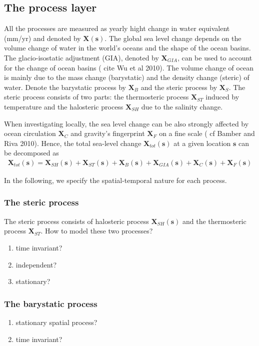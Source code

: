 \documentclass[cmbright,fleqn,referee]{envauth}
\newcommand{\bX}{\bm{X}}
\newcommand{\bs}{\bm{s}}
\begin{document}
\subsection{The process layer}
\label{ss:process}
All the processes are measured as yearly hight change in water equivalent (mm/yr) and denoted by $\bX(\bs)$. The global sea level change depends on the volume change of water in the world's oceans and the shape of the ocean basins. The glacio-isostatic adjustment (GIA), denoted by $\bX_{GIA}$, can be used to account for the change of ocean basins ({\color{red} cite Wu et al 2010}). The volume change of ocean is mainly due to the mass change (barystatic) and the density change (steric) of water. Denote the barystatic process by $\bX_{B}$ and the steric process by $\bX_{S}$. The steric process consists of two parts: the thermosteric process $\bX_{ST}$ induced by temperature and the halosteric process $\bX_{SH}$ due to the salinity change.


When investigating locally, the sea level change can be also strongly affected by ocean circulation $\bX_{C}$ and gravity's fingerprint $\bX_{F}$ on a fine scale ({\color{red} cf Bamber and Riva 2010}). Hence, the total sea-level change $\bX_{tot} (\bs)$ at a given location $\bs$ can be decomposed as
\begin{align}\label{x_tot}
\bX_{tot} (\bs) = \bX_{SH}(\bs) + \bX_{ST}(\bs) + \bX_{B}(\bs) + \bX_{GIA}(\bs) + \bX_{C}(\bs) + \bX_F(\bs) 
\end{align}

In the following, we specify the spatial-temporal nature for each process.

\subsubsection{The steric process}
The steric process consists of halosteric process $\bX_{SH}(\bs)$ and the thermosteric process $\bX_{ST}$. How to model these two processes?
\begin{enumerate}
\item time invariant?
\item independent?
\item stationary?
\end{enumerate} 

\subsubsection{The barystatic process}
\begin{enumerate}
\item stationary spatial process?
\item time invariant?
\end{enumerate}
\end{document}

